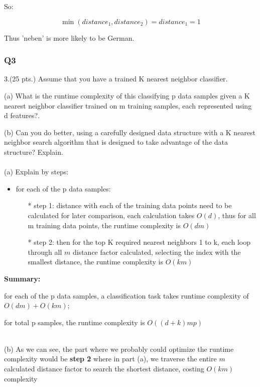 \documentclass[11pt]{article}
\begin{document}
So:

\[\min (distance_1, distance_2) = distance_1 = 1\]

Thus 'neben' is more likely to be German.

    \subsubsection*{Q3}\label{q3}

    3.(25 pts.) Assume that you have a trained K nearest neighbor
classifier.

(a) What is the runtime complexity of this classifying p data samples
    given a K nearest neighbor classifier trained on m training samples,
    each represented using d features?.

(b) Can you do better, using a carefully designed data structure with a
    K nearest neighbor search algorithm that is designed to take
    advantage of the data structure? Explain.\\\\

\noindent (a)
Explain by steps:

\begin{itemize}
\item
  for each of the p data samples:

  \begin{itemize}
  \item[*]
    step 1: distance with each of the training data points need to be
    calculated for later comparison, each calculation takes \(O(d)\),
    thus for all m training data points, the runtime complexity is
    \(O(dm)\)
  \item[*]
    step 2: then for the top K required nearest neighbors 1 to k, each loop through all \(m\) distance factor calculated, selecting the index with the smallest distance, the runtime complexity is \(O(km)\)
  \end{itemize}
\end{itemize}

\noindent \textbf{Summary: }

for each of the p data samples, a classification task takes runtime
complexity of \(O(dm) + O(km)\);

for total p samples, the runtime complexity is \(O((d+k)mp)\)\\\

\noindent (b)
    As we can see, the part where we probably could optimize the runtime
    complexity would be \textbf{step 2} where in part (a), we traverse
    the entire  \(m\) calculated distance factor to search the shortest distance, costing \(O(km)\) complexity\\
\end{document}
